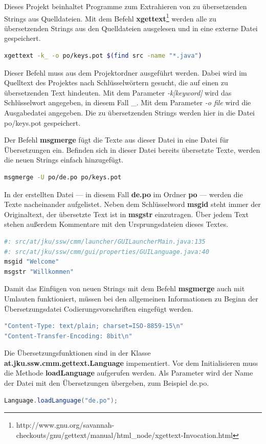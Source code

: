Dieses Projekt beinhaltet Programme zum Extrahieren von zu übersetzenden Strings aus Quelldateien. Mit dem Befehl \textbf{xgettext}\footnote{http://www.gnu.org/savannah-checkouts/gnu/gettext/manual/html\_node/xgettext-Invocation.html} werden alle zu übersetzenden Strings aus den Quelldateien ausgelesen und in eine externe Datei gespeichert.
\begin{lstlisting}[language=sh]
xgettext -k_ -o po/keys.pot $(find src -name "*.java")
\end{lstlisting}
Dieser Befehl muss aus dem Projektordner ausgeführt werden. Dabei wird im Quelltext des Projektes nach Schlüsselwörtern gesucht, die auf einen zu übersetzenden Text hindeuten. Mit dem Parameter \emph{-k[keyword]} wird das Schlüsselwort angegeben, in diesem Fall \glqq{}\_\grqq{}. Mit dem Parameter \emph{-o file} wird die Ausgabedatei angegeben. Die zu übersetzenden Strings werden hier in die Datei po/keys.pot gespeichert.

Der Befehl \textbf{msgmerge} fügt die Texte aus dieser Datei in eine Datei für Übersetzungen ein. Befinden sich in dieser Datei bereits übersetzte Texte, werden die neuen Strings einfach hinzugefügt.
\begin{lstlisting}[language=sh]
msgmerge -U po/de.po po/keys.pot
\end{lstlisting}

In der erstellten Datei --- in diesem Fall \textbf{de.po} im Ordner \textbf{po} --- werden die Texte nacheinander aufgelistet. Neben dem Schlüsselword \textbf{msgid} steht immer der Originaltext, der übersetzte Text ist in \textbf{msgstr} einzutragen. Über jedem Text stehen außerdem Kommentare mit den Ursprungsdateien dieses Textes.
\begin{lstlisting}[language=sh]
#: src/at/jku/ssw/cmm/launcher/GUILauncherMain.java:135
#: src/at/jku/ssw/cmm/gui/properties/GUILanguage.java:40
msgid "Welcome"
msgstr "Willkommen"
\end{lstlisting}

Damit das Einfügen von neuen Strings mit dem Befehl \textbf{msgmerge} auch mit Umlauten funktioniert, müssen bei den allgemeinen Informationen zu Beginn der Übersetzungsdatei Codierungsvorschriften eingefügt werden.
\begin{lstlisting}[language=sh]
"Content-Type: text/plain; charset=ISO-8859-15\n"
"Content-Transfer-Encoding: 8bit\n"
\end{lstlisting}

Die Übersetzungsfunktionen sind in der Klasse \textbf{at.jku.ssw.cmm.gettext.Language} impementiert. Vor dem Initialisieren muss die Methode \textbf{loadLanguage} aufgerufen werden. Als Parameter wird der Name der Datei mit den Übersetzungen übergeben, zum Beispiel \glqq{}de.po\grqq{}.
\begin{lstlisting}[language=JAVA]
Language.loadLanguage("de.po");
\end{lstlisting}

